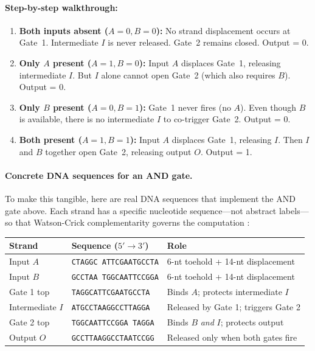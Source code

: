 \paragraph{Step-by-step walkthrough:}
\begin{enumerate}[leftmargin=1.8em]
  \item \textbf{Both inputs absent ($A=0, B=0$):} No strand displacement occurs at Gate~1. Intermediate $I$ is never released. Gate~2 remains closed. Output = 0. \checkmark
  \item \textbf{Only $A$ present ($A=1, B=0$):} Input $A$ displaces Gate~1, releasing intermediate $I$. But $I$ alone cannot open Gate~2 (which also requires $B$). Output = 0. \checkmark
  \item \textbf{Only $B$ present ($A=0, B=1$):} Gate~1 never fires (no $A$). Even though $B$ is available, there is no intermediate $I$ to co-trigger Gate~2. Output = 0. \checkmark
  \item \textbf{Both present ($A=1, B=1$):} Input $A$ displaces Gate~1, releasing $I$. Then $I$ and $B$ together open Gate~2, releasing output $O$. Output = 1. \checkmark
\end{enumerate}

\paragraph{Concrete DNA sequences for an AND gate.}
To make this tangible, here are real DNA sequences that implement the AND gate above. Each strand has a specific nucleotide sequence---not abstract labels---so that Watson-Crick complementarity governs the computation \citep{daleykari2002,seelig2006}:

\begin{center}
\renewcommand{\arraystretch}{1.15}
\begin{tabular}{lll}
\toprule
\textbf{Strand} & \textbf{Sequence ($5' \to 3'$)} & \textbf{Role} \\
\midrule
Input $A$ & \texttt{CTAGGC\,ATTCGAATGCCTA} & 6-nt toehold + 14-nt displacement \\
Input $B$ & \texttt{GCCTAA\,TGGCAATTCCGGA} & 6-nt toehold + 14-nt displacement \\
Gate 1 top & \texttt{TAGGCATTCGAATGCCTA} & Binds $A$; protects intermediate $I$ \\
Intermediate $I$ & \texttt{ATGCCTAAGGCCTTAGGA} & Released by Gate 1; triggers Gate 2 \\
Gate 2 top & \texttt{TGGCAATTCCGGA\,TAGGA} & Binds $B$ \emph{and} $I$; protects output \\
Output $O$ & \texttt{GCCTTAAGGCCTAATCCGG} & Released only when both gates fire \\
\bottomrule
\end{tabular}
\end{center}

